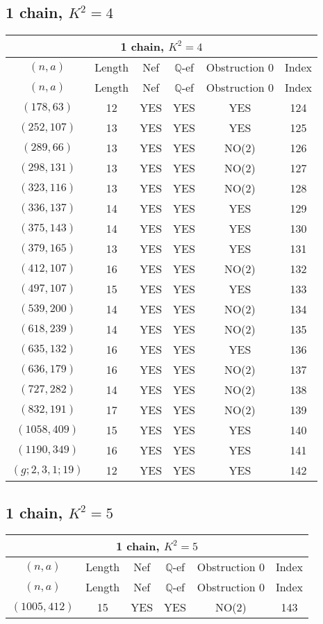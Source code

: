 \subsection{1 chain, $K^2 = 4$}
\begin{longtable}{|c|c|c|c|c|c|}
\hline
\multicolumn{6}{|c|}{1 chain, $K^2 = 4$}\\
\hline
$(n,a)$ & Length & Nef & $\mathbb Q$-ef & Obstruction 0 & Index\\
\hline
\endfirsthead

\hline
$(n,a)$ & Length & Nef & $\mathbb Q$-ef & Obstruction 0 & Index\\
\hline
\endhead
\hline
\endfoot

$(178, 63)$ & 12 & YES & YES & YES & 124\\
$(252, 107)$ & 13 & YES & YES & YES & 125\\
$(289, 66)$ & 13 & YES & YES & NO(2) & 126\\
$(298, 131)$ & 13 & YES & YES & NO(2) & 127\\
$(323, 116)$ & 13 & YES & YES & NO(2) & 128\\
$(336, 137)$ & 14 & YES & YES & YES & 129\\
$(375, 143)$ & 14 & YES & YES & YES & 130\\
$(379, 165)$ & 13 & YES & YES & YES & 131\\
$(412, 107)$ & 16 & YES & YES & NO(2) & 132\\
$(497, 107)$ & 15 & YES & YES & YES & 133\\
$(539, 200)$ & 14 & YES & YES & NO(2) & 134\\
$(618, 239)$ & 14 & YES & YES & NO(2) & 135\\
$(635, 132)$ & 16 & YES & YES & YES & 136\\
$(636, 179)$ & 16 & YES & YES & NO(2) & 137\\
$(727, 282)$ & 14 & YES & YES & NO(2) & 138\\
$(832, 191)$ & 17 & YES & YES & NO(2) & 139\\
$(1058, 409)$ & 15 & YES & YES & YES & 140\\
$(1190, 349)$ & 16 & YES & YES & YES & 141\\
$(g; 2, 3, 1; 19)$ & 12 & YES & YES & YES & 142
\end{longtable}
\subsection{1 chain, $K^2 = 5$}
\begin{longtable}{|c|c|c|c|c|c|}
\hline
\multicolumn{6}{|c|}{1 chain, $K^2 = 5$}\\
\hline
$(n,a)$ & Length & Nef & $\mathbb Q$-ef & Obstruction 0 & Index\\
\hline
\endfirsthead

\hline
$(n,a)$ & Length & Nef & $\mathbb Q$-ef & Obstruction 0 & Index\\
\hline
\endhead
\hline
\endfoot

$(1005, 412)$ & 15 & YES & YES & NO(2) & 143
\end{longtable}
